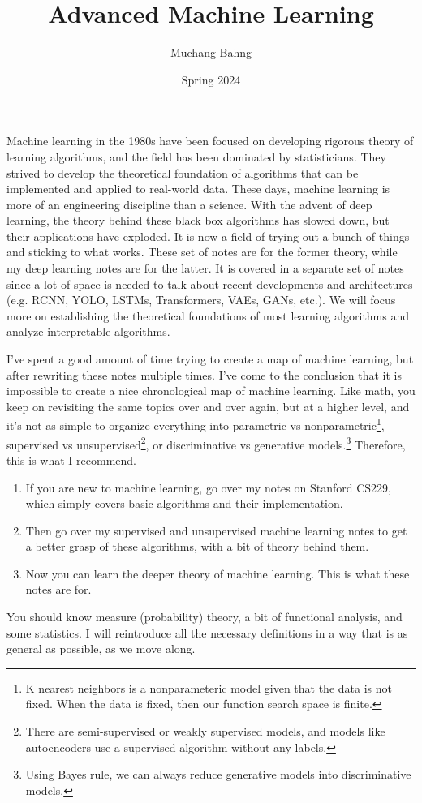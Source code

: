 \documentclass{article}
\begin{document}
\title{Advanced Machine Learning}
\author{Muchang Bahng}
\date{Spring 2024}

\maketitle
\tableofcontents
\pagebreak

Machine learning in the 1980s have been focused on developing rigorous theory of learning algorithms, and the field has been dominated by statisticians. They strived to develop the theoretical foundation of algorithms that can be implemented and applied to real-world data. These days, machine learning is more of an engineering discipline than a science. With the advent of deep learning, the theory behind these black box algorithms has slowed down, but their applications have exploded. It is now a field of trying out a bunch of things and sticking to what works. These set of notes are for the former theory, while my deep learning notes are for the latter. It is covered in a separate set of notes since a lot of space is needed to talk about recent developments and architectures (e.g. RCNN, YOLO, LSTMs, Transformers, VAEs, GANs, etc.). We will focus more on establishing the theoretical foundations of most learning algorithms and analyze interpretable algorithms. 

I've spent a good amount of time trying to create a map of machine learning, but after rewriting these notes multiple times. I've come to the conclusion that it is impossible to create a nice chronological map of machine learning. Like math, you keep on revisiting the same topics over and over again, but at a higher level, and it's not as simple to organize everything into parametric vs nonparametric\footnote{K nearest neighbors is a nonparameteric model given that the data is not fixed. When the data is fixed, then our function search space is finite.}, supervised vs unsupervised\footnote{There are semi-supervised or weakly supervised models, and models like autoencoders use a supervised algorithm without any labels.}, or discriminative vs generative models.\footnote{Using Bayes rule, we can always reduce generative models into discriminative models.} Therefore, this is what I recommend. 

\begin{enumerate}
  \item If you are new to machine learning, go over my notes on Stanford CS229, which simply covers basic algorithms and their implementation. 
  \item Then go over my supervised and unsupervised machine learning notes to get a better grasp of these algorithms, with a bit of theory behind them. 
  \item Now you can learn the deeper theory of machine learning. This is what these notes are for. 
\end{enumerate}
You should know measure (probability) theory, a bit of functional analysis, and some statistics. I will reintroduce all the necessary definitions in a way that is as general as possible, as we move along. 
\end{document}
